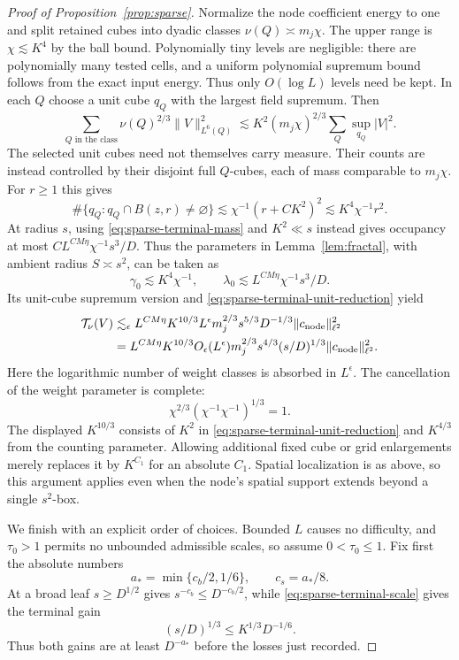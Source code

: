 \begin{proof}[Proof of Proposition~\ref{prop:sparse}]
Normalize the node coefficient energy to one and split retained cubes
into dyadic classes
$\nu(Q)\asymp m_j\chi$.  The upper range is
$\chi\lesssim K^4$ by the ball bound.  Polynomially tiny levels are
negligible: there are polynomially many tested cells, and a uniform
polynomial supremum bound follows from the exact input energy.
Thus only $O(\log L)$ levels need be kept.  In each $Q$ choose a unit
cube $q_Q$ with the largest field supremum.  Then
\begin{equation}\label{eq:sparse-terminal-unit-reduction}
 \sum_{Q\text{ in the class}}\nu(Q)^{2/3}\|V\|_{L^6(Q)}^2
 \lesssim K^2(m_j\chi)^{2/3}
       \sum_Q\sup_{q_Q}|V|^2.
\end{equation}
The selected unit cubes need not themselves carry measure.  Their
counts are instead controlled by their disjoint full $Q$-cubes, each
of mass comparable to $m_j\chi$.  For $r\ge1$ this gives
\[
 \#\{q_Q:q_Q\cap B(z,r)\ne\varnothing\}
 \lesssim \chi^{-1}(r+CK^2)^2
 \lesssim K^4\chi^{-1}r^2.
\]
At radius $s$, using \eqref{eq:sparse-terminal-mass} and $K^2\ll s$
instead gives occupancy at most
$C L^{CM\eta}\chi^{-1}s^3/D$.
Thus the parameters in Lemma~\ref{lem:fractal}, with ambient radius
$S\asymp s^2$, can be taken as
\[
 \gamma_0\lesssim K^4\chi^{-1},\qquad
 \lambda_0\lesssim L^{CM\eta}\chi^{-1}s^3/D.
\]
Its unit-cube supremum version and
\eqref{eq:sparse-terminal-unit-reduction} yield
\begin{align}
 \mathcal T_\nu(V)
 &\lesssim_\epsilon
    L^{CM\eta}K^{10/3}L^\epsilon
       m_j^{2/3}s^{5/3}D^{-1/3}\|c_{\rm node}\|_{\ell^2}^2
       \notag\\
 &=L^{CM\eta}K^{10/3}O_\epsilon(L^\epsilon)
       m_j^{2/3}s^{4/3}(s/D)^{1/3}
       \|c_{\rm node}\|_{\ell^2}^2.
       \label{eq:sparse-terminal}
\end{align}
Here the logarithmic number of weight classes is absorbed in
$L^\epsilon$.  The cancellation of the weight parameter is complete:
\[
 \chi^{2/3}(\chi^{-1}\chi^{-1})^{1/3}=1.
\]
The displayed $K^{10/3}$ consists of $K^2$ in
\eqref{eq:sparse-terminal-unit-reduction} and $K^{4/3}$ from the
counting parameter.  Allowing additional fixed cube or grid
enlargements merely replaces it by $K^{C_1}$ for an absolute $C_1$.
Spatial localization is as above, so this argument applies even when
the node's spatial support extends beyond a single $s^2$-box.

We finish with an explicit order of choices.  Bounded $L$ causes no
difficulty, and $\tau_0>1$ permits no unbounded admissible scales, so
assume $0<\tau_0\le1$.  Fix first the absolute numbers
\begin{equation}\label{eq:sparse-saving-choice}
 a_* =\min\{c_b/2,1/6\},\qquad c_s=a_*/8.
\end{equation}
At a broad leaf $s\ge D^{1/2}$ gives
$s^{-c_b}\le D^{-c_b/2}$, while
\eqref{eq:sparse-terminal-scale} gives the terminal gain
\[
 (s/D)^{1/3}\le K^{1/3}D^{-1/6}.
\]
Thus both gains are at least $D^{-a_*}$ before the losses just recorded.


\end{proof}
